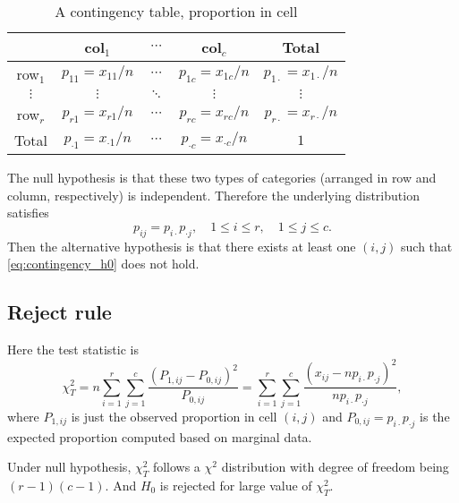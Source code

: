 \documentclass[a4paper,12pt]{article}
\begin{document}
\begin{table}[htbp]
  \centering
  \begin{tabular}{|c|c|c|c|c|}
    \hline
             & col$_1$ & $\cdots $ & col$_c$ & Total \\
    \hline
    row$_1$  & $p_{11} = x_{11}/n$ & $\cdots$ & $p_{1c} = x_{1c} / n$ & $p_{1\cdot} = x_{1\cdot} / n$    \\
    \hline
    $\vdots$ & $\vdots$ & $\ddots$ & $\vdots$ & $\vdots$    \\
    \hline
    row$_r$  & $p_{r1} = x_{r1} / n$ & $\cdots$ & $p_{rc} = x_{rc} / n$ & $p_{r\cdot} = x_{r\cdot} / n$    \\
    \hline
    Total    & $p_{\cdot 1} = x_{\cdot 1} / n$ & $\cdots$ & $p_{\cdot c} = x_{\cdot c} / n$ & $1$    \\
    \hline
  \end{tabular}
  \caption{A contingency table, proportion in cell}
  \label{tab:contingency_table_proportion}
\end{table}

The null hypothesis is that these two types of categories (arranged in row and column, respectively) is independent. Therefore the underlying distribution satisfies
\begin{equation}
  \label{eq:contingency_h0}
  p_{ij} = p_{i\cdot}p_{\cdot j},\quad 1\leq i \leq r,\quad 1\leq j \leq c.
\end{equation}
Then the alternative hypothesis is that there exists at least one $\left(i, j\right)$ such that \eqref{eq:contingency_h0} does not hold.

\subsection{Reject rule}
\label{sec:reject-rule-1}

Here the test statistic is
\[
  \chi^2_T =
  n\sum\limits_{i = 1}^r\sum\limits_{j = 1}^c
  \frac{\left(P_{1,ij} - P_{0,ij}\right)^2}{P_{0,ij}}
  = \sum\limits_{i = 1}^r\sum\limits_{j = 1}^c
  \frac{\left(
      x_{ij} - np_{i\cdot}p_{\cdot j}
    \right)^2}{np_{i\cdot}p_{\cdot j}}
  ,
\]
where $P_{1,ij}$ is just the observed proportion in cell $\left(i, j\right)$ and $P_{0,ij} = p_{i\cdot}p_{\cdot j}$ is the expected proportion computed based on marginal data.
\par
Under null hypothesis, $\chi^2_T$ follows a $\chi^2$ distribution with degree of freedom being $\left(r - 1\right)\left(c - 1\right)$. And $H_0$ is rejected for large value of $\chi^2_T$.
\end{document}
